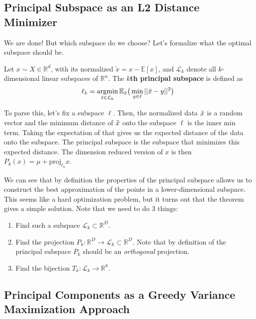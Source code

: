 \subsection{Principal Subspace as an L2 Distance Minimizer}

  We are done! But which subspace do we choose? Let's formalize what the optimal subspace should be. 

  \begin{definition}
    Let $x \sim X \in \mathbb{R}^d$, with its normalized $\tilde{x} = x - \mathbb{E}[x]$, and $\mathcal{L}_k$ denote all $k$-dimensional linear subspaces of $\mathbb{R}^n$. The \textbf{$k$th principal subspace} is defined as 
    \begin{equation}
      \ell_k = \operatorname*{\arg\!\min}_{\ell \in \mathcal{L}_k} \mathbb{E}_{\Tilde{x}} \big( \min_{y \in \ell} ||\Tilde{x} - y||^2 \big)
    \end{equation}
  \end{definition}

  To parse this, let's fix a subspace $\ell$. Then, the normalized data $\Tilde{x}$ is a random vector and the minimum distance of $\Tilde{x}$ onto the subspace $\ell$ is the inner min term. Taking the expectation of that gives us the expected distance of the data onto the subspace. The principal subspace is the subspace that minimizes this expected distance. The dimension reduced version of $x$ is then $P_k (x) = \mu + \mathrm{proj}_{\ell_k} x$. 

  We can see that by definition the properties of the principal subspace allows us to construct the best approximation of the points in a lower-dimensional subspace. This seems like a hard optimization problem, but it turns out that the theorem gives a simple solution. Note that we need to do 3 things: 
  \begin{enumerate}
    \item Find such a subspace $\mathcal{L}_k \subset \mathbb{R}^D$. 
    \item Find the projection $P_k: \mathbb{R}^D \rightarrow \mathcal{L}_k \subset \mathbb{R}^D$. Note that by definition of the principal subspace $P_k$ should be an \textit{orthogonal} projection. 
    \item Find the bijection $T_k: \mathcal{L}_k \rightarrow \mathbb{R}^k$. 
  \end{enumerate}

\subsection{Principal Components as a Greedy Variance Maximization Approach}

